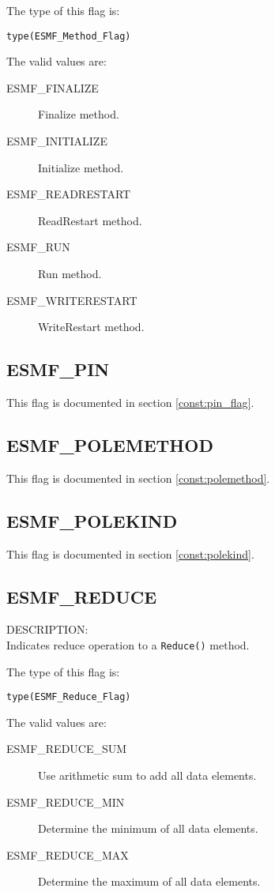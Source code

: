 The type of this flag is:

{\tt type(ESMF\_Method\_Flag)}

The valid values are:
\begin{description}
\item [ESMF\_FINALIZE]
      Finalize method.
\item [ESMF\_INITIALIZE]
      Initialize method.
\item [ESMF\_READRESTART]
      ReadRestart method.
\item [ESMF\_RUN]
      Run method.
\item [ESMF\_WRITERESTART]
      WriteRestart method.
\end{description}

\subsection{ESMF\_PIN}
This flag is documented in section \ref{const:pin_flag}.

\subsection{ESMF\_POLEMETHOD}
This flag is documented in section \ref{const:polemethod}.

\subsection{ESMF\_POLEKIND}
This flag is documented in section \ref{const:polekind}.

\subsection{ESMF\_REDUCE}
\label{const:reduce}
{\sf DESCRIPTION:\\}
Indicates reduce operation to a {\tt Reduce()} method.

The type of this flag is:

{\tt type(ESMF\_Reduce\_Flag)}

The valid values are:
\begin{description}
   \item [ESMF\_REDUCE\_SUM]
         Use arithmetic sum to add all data elements.
   \item [ESMF\_REDUCE\_MIN]
         Determine the minimum of all data elements.
   \item [ESMF\_REDUCE\_MAX]
         Determine the maximum of all data elements.
\end{description}

